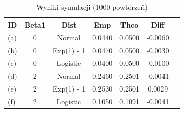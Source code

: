 \begin{table}[H]
\caption{Wyniki symulacji (1000 powtórzeń)}
\label{tab:zad3_mc}
\begin{tabular}{lcccccc}
\toprule
ID & Beta1 & Dist & Emp & Theo & Diff \\
\midrule
(a) & 0 & Normal & 0.0440 & 0.0500 & -0.0060 \\
(b) & 0 & Exp(1) - 1 & 0.0470 & 0.0500 & -0.0030 \\
(c) & 0 & Logistic & 0.0400 & 0.0500 & -0.0100 \\
(d) & 2 & Normal & 0.2460 & 0.2501 & -0.0041 \\
(e) & 2 & Exp(1) - 1 & 0.2530 & 0.2501 & 0.0029 \\
(f) & 2 & Logistic & 0.1050 & 0.1091 & -0.0041 \\
\bottomrule
\end{tabular}
\end{table}
